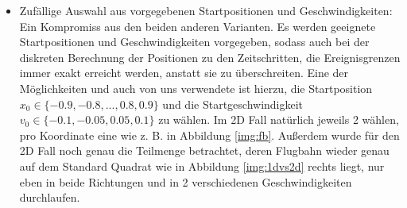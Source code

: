 \begin{description}
\begin{itemize}
		\item Zufällige Auswahl aus vorgegebenen Startpositionen und Geschwindigkeiten: Ein Kompromiss aus den beiden anderen Varianten. Es werden geeignete Startpositionen und Geschwindigkeiten vorgegeben, sodass auch bei der diskreten Berechnung der Positionen zu den Zeitschritten, die Ereignisgrenzen immer exakt erreicht werden, anstatt sie zu überschreiten. Eine der Möglichkeiten und auch von uns verwendete ist hierzu, die Startposition $ x_{0} \in \{-0.9,-0.8, ... ,0.8,0.9\} $ und die Startgeschwindigkeit $ v_{0} \in \{-0.1,-0.05,0.05,0.1\} $ zu wählen. Im 2D Fall natürlich jeweils 2 wählen, pro Koordinate eine wie z. B. in Abbildung \ref{img:fb}. Außerdem wurde für den 2D Fall noch genau die Teilmenge betrachtet, deren Flugbahn wieder genau auf dem Standard Quadrat wie in Abbildung \ref{img:1dvs2d} rechts liegt, nur eben in beide Richtungen und in 2 verschiedenen Geschwindigkeiten durchlaufen. 
		

\end{itemize}
\end{description}
